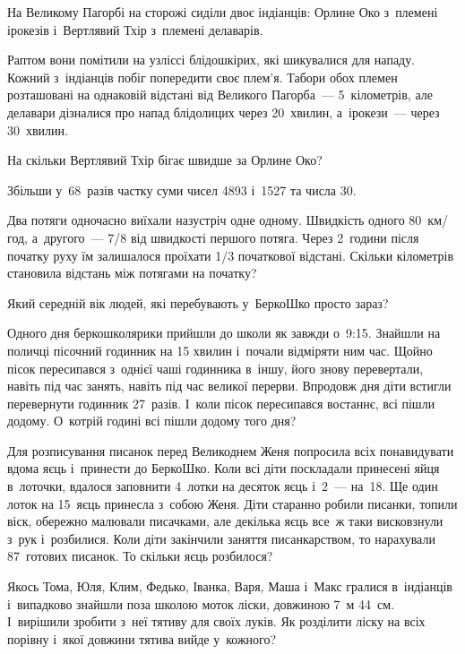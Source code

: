 \problem
На Великому Пагорбі на сторожі сиділи двоє індіанців:
Орлине Око з~племені ірокезів і~Вертлявий Тхір з~племені делаварів.

Раптом вони помітили на узліссі блідошкірих, які шикувалися для нападу.
Кожний з~індіанців побіг попередити своє плем’я.
Табори обох племен розташовані на однаковій відстані від Великого Пагорба~---
5~кілометрів, але делавари дізналися про напад блідолицих через 20~хвилин,
а~ірокези~--- через 30~хвилин.

На скільки Вертлявий Тхір бігає швидше за Орлине Око?


\problem
Збільши у~68~разів частку суми чисел 4893 і~1527 та числа 30.


\problem
Два потяги одночасно виїхали назустріч одне одному.
Швидкість одного 80~км/год, а~другого~--- 7/8 від швидкості першого потяга.
Через 2~години після початку руху їм залишалося проїхати
1/3 початкової відстані.
Скільки кілометрів становила відстань між потягами на початку?


\problem
Який середній вік людей, які перебувають у~БеркоШко просто зараз?


\problem
Одного дня беркошколярики прийшли до школи як завжди о~9:15.
Знайшли на поличці пісочний годинник на 15 хвилин і~почали відміряти ним час.
Щойно пісок пересипався з~однієї чаші годинника в~іншу,
його знову перевертали, навіть під час занять,
навіть під час великої перерви.
Впродовж дня діти встигли перевернути годинник 27~разів.
І~коли пісок пересипався востаннє, всі пішли додому.
О~котрій годині всі пішли додому того дня?


\problem
Для розписування писанок перед Великоднем Женя попросила всіх понавидувати
вдома яєць і~принести до БеркоШко. Коли всі діти поскладали принесені яйця
в~лоточки, вдалося заповнити 4~лотки на десяток яєць і~2~--- на~18.
Ще один лоток на 15~яєць принесла з~собою Женя.
Діти старанно робили писанки, топили віск, обережно малювали писачками,
але декілька яєць все~ж таки висковзнули з~рук і~розбилися.
Коли діти закінчили заняття писанкарством, то нарахували 87~готових писанок.
То скільки яєць розбилося?


\problem
Якось Тома, Юля, Клим, Федько, Іванка, Варя, Маша і~Макс гралися
в~індіанців і~випадково знайшли поза школою моток ліски, довжиною 7~м 44~см.
І~вирішили зробити з~неї тятиву для своїх луків.
Як розділити ліску на всіх порівну і~якої довжини тятива вийде у~кожного?
